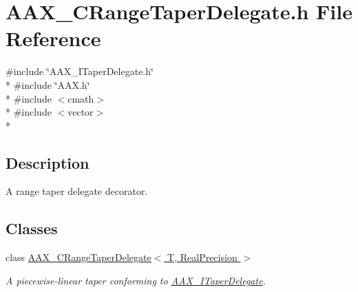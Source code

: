 \hypertarget{a00194}{}\section{A\+A\+X\+\_\+\+C\+Range\+Taper\+Delegate.\+h File Reference}
\label{a00194}
{\ttfamily \#include \char`\"{}A\+A\+X\+\_\+\+I\+Taper\+Delegate.\+h\char`\"{}}\\*
{\ttfamily \#include \char`\"{}A\+A\+X.\+h\char`\"{}}\\*
{\ttfamily \#include $<$cmath$>$}\\*
{\ttfamily \#include $<$vector$>$}\\*


\subsection{Description}
A range taper delegate decorator. 

\subsection*{Classes}
\begin{DoxyCompactItemize}
\item 
class \hyperlink{a00038}{A\+A\+X\+\_\+\+C\+Range\+Taper\+Delegate$<$ T, Real\+Precision $>$}
\begin{DoxyCompactList}\small\item\em A piecewise-\/linear taper conforming to \hyperlink{a00114}{A\+A\+X\+\_\+\+I\+Taper\+Delegate}. \end{DoxyCompactList}\end{DoxyCompactItemize}
